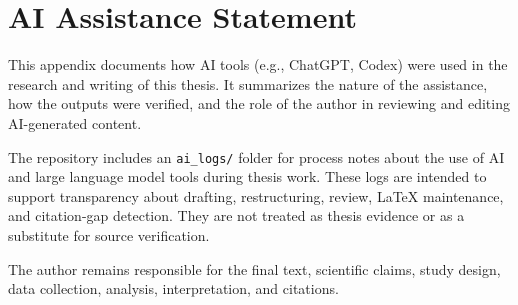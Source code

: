 
\chapter{AI Assistance Statement}
\label{app:ai_assistance}

This appendix documents how AI tools (e.g., ChatGPT, Codex) were used in the research and writing of this thesis. It summarizes the nature of the assistance, how the outputs were verified, and the role of the author in reviewing and editing AI-generated content.

The repository includes an \texttt{ai\_logs/} folder for process notes about the use of AI and large language model tools during thesis work. These logs are intended to support transparency about drafting, restructuring, review, LaTeX maintenance, and citation-gap detection. They are not treated as thesis evidence or as a substitute for source verification.

The author remains responsible for the final text, scientific claims, study design, data collection, analysis, interpretation, and citations.

